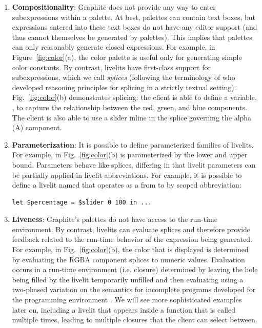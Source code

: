 \begin{enumerate}
  \item \textbf{Compositionality}:
  Graphite does not provide any way to {enter subexpressions within a palette}.
  At best, palettes can contain text boxes, but expressions entered into these text boxes
  do not have any editor support (and thus cannot themselves be generated by palettes).
  This implies that palettes can only reasonably generate {closed expressions}.
  For example, in Figure~\ref{fig:color}(a), the color palette
  is useful only for generating simple color constants.
  By contrast, livelits have first-class support for subexpressions, which we call \emph{splices} (following
  the terminology of \citet{TLMs} who developed reasoning principles for splicing in a strictly textual setting).
  Fig.~\ref{fig:color}(b) demonstrates splicing: the client is able to define a variable, ,
  to capture the relationship between the red, green, and blue components.
  The client is also able to use a slider inline in the splice governing
  the alpha (A) component.

  \item \textbf{Parameterization}: It is possible to define parameterized families of livelits.
  For example,  in Fig.~\ref{fig:color}(b) is parameterized by the lower and upper bound.
  Parameters behave like splices, differing in that livelit parameters can be partially applied in
  livelit abbreviations. For example, it is possible to define a livelit named 
  that operates as a  from  to  by scoped abbreviation:
  \begin{lstlisting}[numbers=none]
  let $percentage = $slider 0 100 in ...
  \end{lstlisting}

  \item \textbf{Liveness}: Graphite's palettes do not have
  access to the run-time environment. By contrast, livelits can evaluate splices
  and therefore provide feedback related to the run-time behavior of the expression being generated.
  For example, in Fig.~\ref{fig:color}(b), the color that is displayed is determined by evaluating the RGBA
  component splices to numeric values.
  Evaluation occurs in a run-time environment (i.e. closure) determined by
  leaving the hole being filled by the livelit temporarily unfilled and then evaluating
  using a two-phased variation on the semantics for incomplete programs developed for the \Hazel programming environment \cite{HazelnutLive}.
  We will see more sophisticated examples later on, including a livelit
  that appears inside a function that is called multiple times, leading to multiple closures that the client can
   select between.
\end{enumerate}

